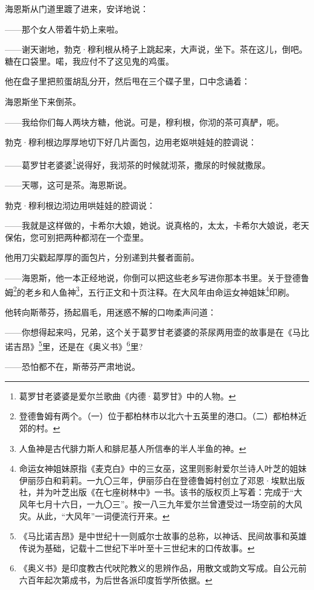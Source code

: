 \par 海恩斯从门道里踱了进来，安详地说：
\par ——那个女人带着牛奶上来啦。
\par ——谢天谢地，勃克·穆利根从椅子上跳起来，大声说，坐下。茶在这儿，倒吧。糖在口袋里。喏，我应付不了这见鬼的鸡蛋。
\par 他在盘子里把煎蛋胡乱分开，然后甩在三个碟子里，口中念诵着：
\par 海恩斯坐下来倒茶。
\par ——我给你们每人两块方糖，他说。可是，穆利根，你沏的茶可真酽，呃。
\par 勃克·穆利根边厚厚地切下好几片面包，边用老妪哄娃娃的腔调说：
\par ——葛罗甘老婆婆\footnote{葛罗甘老婆婆是爱尔兰歌曲《内德·葛罗甘》中的人物。}说得好，我沏茶的时候就沏茶，撒尿的时候就撒尿。
\par ——天哪，这可是茶。海恩斯说。
\par 勃克·穆利根边沏边用哄娃娃的腔调说：
\par ——我就是这样做的，卡希尔大娘，她说。说真格的，太太，卡希尔大娘说，老天保佑，您可别把两种都沏在一个壶里。
\par 他用刀尖戳起厚厚的面包片，分别递到共餐者面前。
\par ——海恩斯，他一本正经地说，你倒可以把这些老乡写进你那本书里。关于登德鲁姆\footnote{登德鲁姆有两个。（一）位于都柏林市以北六十五英里的港口。（二）都柏林近郊的村。}的老乡和人鱼神\footnote{人鱼神是古代腓力斯人和腓尼基人所信奉的半人半鱼的神。}，五行正文和十页注释。在大风年由命运女神姐妹\footnote{命运女神姐妹原指《麦克白》中的三女巫，这里则影射爱尔兰诗人叶芝的姐妹伊丽莎白和莉莉。一九〇三年，伊丽莎白在登德鲁姆村创立了邓恩·埃默出版社，并为叶芝出版《在七座树林中》一书。该书的版权页上写着：完成于“大风年七月十六日，一九〇三”。按一八三九年爱尔兰曾遭受过一场空前的大风灾。从此，“大风年”一词便流行开来。}印刷。
\par 他转向斯蒂芬，扬起眉毛，用迷惑不解的口吻柔声问道：
\par ——你想得起来吗，兄弟，这个关于葛罗甘老婆婆的茶尿两用壶的故事是在《马比诺吉昂》\footnote{《马比诺吉昂》是中世纪十一则威尔士故事的总称，以神话、民间故事和英雄传说为基础，记载十二世纪下半叶至十三世纪末的口传故事。}里，还是在《奥义书》\footnote{《奥义书》是印度教古代吠陀教义的思辨作品，用散文或韵文写成。自公元前六百年起次第成书，为后世各派印度哲学所依据。}里?
\par ——恐怕都不在，斯蒂芬严肃地说。
